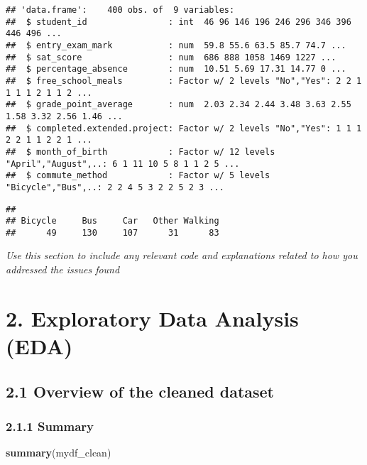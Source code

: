 \documentclass[
]{article}
\newenvironment{Shaded}{\begin{snugshade}}{\end{snugshade}}
\newcommand{\FunctionTok}[1]{\textcolor[rgb]{0.13,0.29,0.53}{\textbf{#1}}}
\newcommand{\NormalTok}[1]{#1}
\newcommand{\SpecialCharTok}[1]{\textcolor[rgb]{0.81,0.36,0.00}{\textbf{#1}}}
\begin{document}
\begin{verbatim}
## 'data.frame':    400 obs. of  9 variables:
##  $ student_id                : int  46 96 146 196 246 296 346 396 446 496 ...
##  $ entry_exam_mark           : num  59.8 55.6 63.5 85.7 74.7 ...
##  $ sat_score                 : num  686 888 1058 1469 1227 ...
##  $ percentage_absence        : num  10.51 5.69 17.31 14.77 0 ...
##  $ free_school_meals         : Factor w/ 2 levels "No","Yes": 2 2 1 1 1 1 2 1 1 2 ...
##  $ grade_point_average       : num  2.03 2.34 2.44 3.48 3.63 2.55 1.58 3.32 2.56 1.46 ...
##  $ completed.extended.project: Factor w/ 2 levels "No","Yes": 1 1 1 2 2 1 1 2 2 1 ...
##  $ month_of_birth            : Factor w/ 12 levels "April","August",..: 6 1 11 10 5 8 1 1 2 5 ...
##  $ commute_method            : Factor w/ 5 levels "Bicycle","Bus",..: 2 2 4 5 3 2 2 5 2 3 ...
\end{verbatim}

\begin{Shaded}
\end{Shaded}

\begin{verbatim}
## 
## Bicycle     Bus     Car   Other Walking 
##      49     130     107      31      83
\end{verbatim}

\emph{Use this section to include any relevant code and explanations
related to how you addressed the issues found}

\section{2. Exploratory Data Analysis
(EDA)}\label{exploratory-data-analysis-eda}

\subsection{2.1 Overview of the cleaned
dataset}\label{overview-of-the-cleaned-dataset}

\subsubsection{2.1.1 Summary}\label{summary}

\begin{Shaded}
\begin{Highlighting}[]
\FunctionTok{summary}\NormalTok{(mydf\_clean)}
\end{Highlighting}
\end{Shaded}
\end{document}
